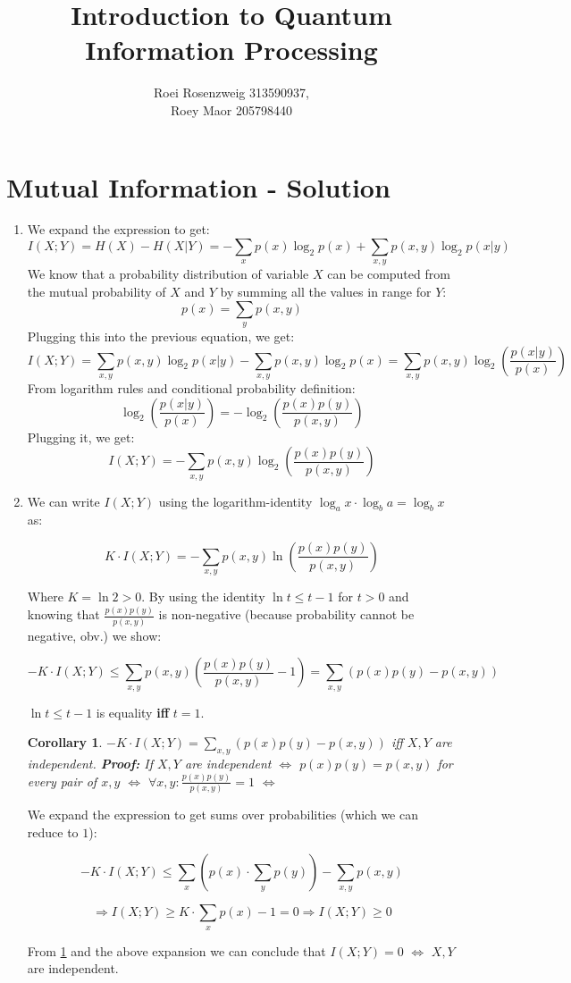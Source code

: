 \documentclass[a4paper,10pt]{hw}
\title{Introduction to Quantum Information Processing}
\author{Roei Rosenzweig 313590937,\\ Roey Maor 205798440}
\newtheorem{corollary}{Corollary}[theorem]
\begin{document}
\maketitle

\section{Mutual Information - Solution}

\begin{enumerate}

\item %

We expand the expression to get:
$$I(X;Y) = H(X) - H(X|Y) = -\sum_{x}p(x)\log_{2}p(x) + \sum_{x,y}p(x,y)\log_{2}p(x|y)$$
We know that a probability distribution of variable $X$ can be computed from the mutual probability of $X$ and $Y$ by summing all the values in range for $Y$:
$$p(x) = \sum_{y}p(x,y)$$
Plugging this into the previous equation, we get:
$$I(X;Y) = \sum_{x,y}p(x,y)\log_{2}p(x|y) - \sum_{x,y}p(x,y)\log_{2}p(x) = \sum_{x,y}p(x,y)\log_{2}\left(\frac{p(x|y)}{p(x)}\right)$$
From logarithm rules and conditional probability definition:
$$\log_{2}\left(\frac{p(x|y)}{p(x)}\right) = -\log_{2}\left(\frac{p(x)p(y)}{p(x,y)}\right)$$
Plugging it, we get:
$$\boxed{ I(X;Y) = -\sum_{x,y}p(x,y)\log_{2}\left(\frac{p(x)p(y)}{p(x,y)}\right)}$$

\item %

We can write $I(X;Y)$ using the logarithm-identity $\log_{a}x \cdot \log_{b}a = \log_{b}x$ as:

$$ K\cdot I(X;Y) = -\sum_{x,y}p(x,y)\ln\left(\frac{p(x)p(y)}{p(x,y)}\right) $$

Where $K = \ln 2 > 0$. By using the identity $\ln t \leq t - 1$ for $t > 0$ and knowing that $\frac{p(x)p(y)}{p(x,y)}$ is non-negative (because probability cannot be negative, obv.) we show:

$$ - K\cdot I(X;Y) \leq \sum_{x,y}p(x,y)\left(\frac{p(x)p(y)}{p(x,y)} - 1\right)
	= \sum_{x,y}\left(p(x)p(y) - p(x,y)\right) $$

$\ln t \leq t - 1$ is equality \textbf{iff} $t = 1$.
\begin{corollary}
\label{corollary:1}
$-  K\cdot I(X;Y) = \sum_{x,y}\left(p(x)p(y) - p(x,y)\right) $ \emph{iff} $X, Y$ are independent. \textbf{Proof:} If $X, Y$ are independent $\iff$ $p(x)p(y) = p(x,y)$ for every pair of $x,y$ $\iff$ $\forall x,y: \frac{p(x)p(y)}{p(x,y)} = 1$ $\iff$
\end{corollary}

We expand the expression to get sums over probabilities (which we can reduce to $1$):

$$ - K\cdot I(X;Y) \leq \sum_{x} \left(p(x) \cdot \sum_{y} p(y)\right) - \sum_{x,y}p(x,y) $$

$$ \Rightarrow I(X;Y) \geq K \cdot \sum_{x} p(x) - 1 = 0 \Rightarrow \boxed{I(X;Y) \geq 0}$$

From \ref{corollary:1} and the above expansion we can conclude that $I(X;Y) = 0$ $\iff$ $X, Y$ are independent.


\end{enumerate}
\end{document}
